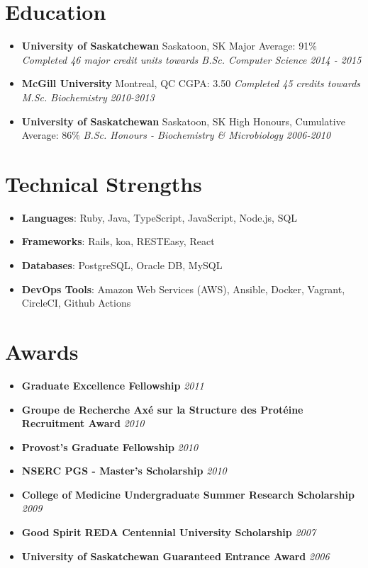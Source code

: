 \documentclass[letterpaper,11pt]{article}
\newcommand{\resumeSubHeadingEducation}[5]{
	\item[]
      \textbf{#1} \hfill #2 \newline
      #3 \newline
      \textit{#4} \hfill \textit{#5}
}
\newcommand{\technology}[2]{
	\item[]
	  \textbf{#1}: #2
}
\newcommand{\award}[2]{
	\item[]
	  \textbf{#1} \hfill \textit{#2}
}
\begin{document}
\newpage

\section{Education}
	\begin{itemize}[leftmargin=*]
	    \resumeSubHeadingEducation
	      {University of Saskatchewan}{Saskatoon, SK}
	      {Major Average: 91\%}
	      {Completed 46 major credit units towards B.Sc. Computer Science}{2014 - 2015}
	    \resumeSubHeadingEducation
	      {McGill University}{Montreal, QC}
	      {CGPA: 3.50}
	      {Completed 45 credits towards M.Sc. Biochemistry}{2010-2013}
      \resumeSubHeadingEducation
        {University of Saskatchewan}{Saskatoon, SK}
        {High Honours, Cumulative Average: 86\%}
        {B.Sc. Honours - Biochemistry \& Microbiology}{2006-2010}
     \end{itemize}

\section{Technical Strengths}
 \begin{itemize}[leftmargin=*,noitemsep,topsep=0pt]
   \technology{Languages}{Ruby, Java, TypeScript, JavaScript, Node.js, SQL}
   \technology{Frameworks}{Rails, koa, RESTEasy, React}
   \technology{Databases}{PostgreSQL, Oracle DB, MySQL}
   \technology{DevOps Tools}{Amazon Web Services (AWS), Ansible, Docker, Vagrant, CircleCI, Github Actions}
 \end{itemize}

\section{Awards}
 \begin{itemize}[leftmargin=*,noitemsep,topsep=0pt]
	\award{Graduate Excellence Fellowship}{2011}
	\award{Groupe de Recherche Axé sur la Structure des Protéine Recruitment Award}{2010}
	\award{Provost’s Graduate Fellowship}{2010}
	\award{NSERC PGS - Master’s Scholarship}{2010}
	\award{College of Medicine Undergraduate Summer Research Scholarship}{2009}
	\award{Good Spirit REDA Centennial University Scholarship}{2007}
	\award{University of Saskatchewan Guaranteed Entrance Award}{2006}
  \end{itemize}

\end{document}
